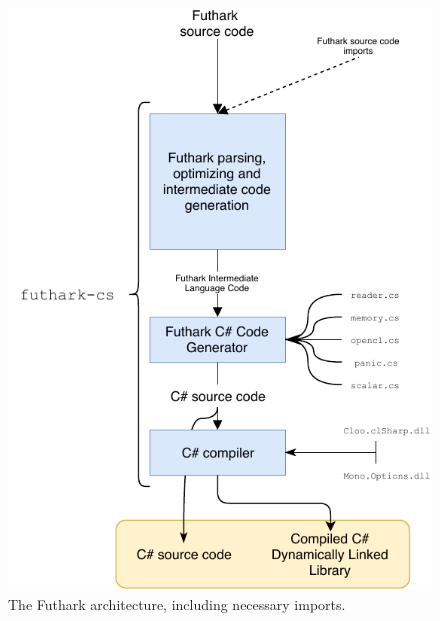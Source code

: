 \begin{figure}[H]
  \centering
  \includegraphics[scale=0.85]{chapters/figs/csharp/futharkcsarchitecture.pdf}
  \caption{The Futhark \csharp{} architecture, including necessary imports.}
  \label{fig:futharkcompilerlowerlevel}
\end{figure}

